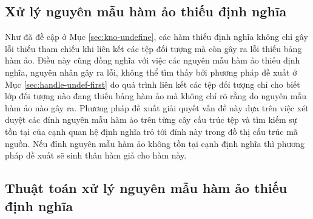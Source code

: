 %         
%         

\subsection{Xử lý nguyên mẫu hàm ảo thiếu định nghĩa} \label{sec:handle-undef-second}
Như đã đề cập ở Mục \autoref{sec:kno-undefine}, các hàm thiếu định nghĩa không chỉ gây lỗi thiếu tham chiếu khi liên kết các tệp đối tượng mà còn gây ra lỗi thiếu bảng hàm ảo. Điều này cũng đồng nghĩa với việc các nguyên mẫu hàm ảo thiếu định nghĩa, nguyên nhân gây ra lỗi, không thể tìm thấy bởi phương pháp đề xuất ở Mục \autoref{sec:handle-undef-first} do quá trình liên kết các tệp đối tượng chỉ cho biết lớp đối tượng nào đang thiếu bảng hàm ảo mà không chỉ rõ rằng do nguyên mẫu hàm ảo nào gây ra. Phương pháp đề xuất giải quyết vấn đề này dựa trên việc xét duyệt các đỉnh nguyên mẫu hàm ảo trên từng cây cấu trúc tệp và tìm kiếm sự tồn tại của cạnh quan hệ định nghĩa trỏ tới đỉnh này trong đồ thị cấu trúc mã nguồn. Nếu đỉnh nguyên mẫu hàm ảo không tồn tại cạnh định nghĩa thì phương pháp đề xuất sẽ sinh thân hàm giả cho hàm này.

\subsection*{Thuật toán xử lý nguyên mẫu hàm ảo thiếu định nghĩa}

